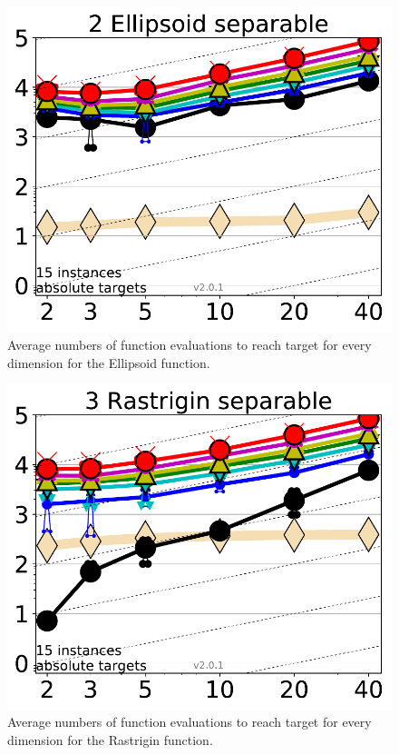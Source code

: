 \begin{figure}[h!t]
    \centering
        \includegraphics[width=5in]{img/Ellipsoid.pdf}
    \caption{Average numbers of function evaluations to reach target
      for every dimension for the Ellipsoid function.}
    \label{fig:ellipsoid}
\end{figure}

\begin{figure}[h!t]
    \centering
        \includegraphics[width=5in]{img/Rastrigin.pdf}
    \caption{Average numbers of function evaluations to reach target
      for every dimension for the Rastrigin function.}
    \label{fig:rastrigin}
\end{figure}


